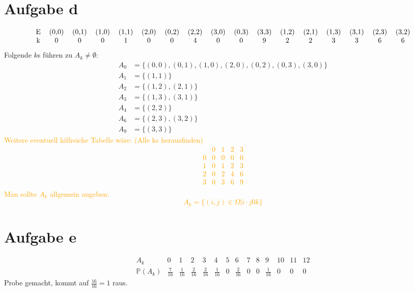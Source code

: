 \documentclass{article} %
\begin{document}
\section{Aufgabe d}
\[
\begin{tabular}{ccccccccccccccccc}
    E & (0,0)& (0,1) & (1,0)  & (1,1) & (2,0) & (0,2) & (2,2) & (3,0) & (0,3) & (3,3) & (1,2) & (2,1) & (1,3) & (3,1) & (2,3) & (3,2) \\
    k & 0 & 0 & 0 & 1 & 0& 0 & 4 & 0 & 0 & 9 & 2 & 2 & 3 & 3 & 6 & 6  
\end{tabular}
\]
Folgende $k$s führen zu $A_k \neq \emptyset$:
\begin{align*}
    A_0 & = \{(0,0), (0,1), (1,0), (2,0), (0,2), (0,3), (3,0)\} \\
    A_1 & = \{(1,1)\} \\
    A_2 & = \{(1,2), (2,1)\} \\
    A_3 & = \{(1,3), (3,1)\} \\
    A_4 & = \{(2,2)\} \\
    A_6 & = \{(2,3), (3,2)\} \\
    A_9 & = \{(3,3)\}
\end{align*}
\textcolor{Orange}{
Weitere eventuell hilfreiche Tabelle wäre: (Alle ks herausfinden)
\[
\begin{array}{c|cccc}
     & 0 & 1 & 2 & 3 \\ \hline
     0 & 0 & 0 & 0 & 0 \\
     1 & 0 & 1 & 2 & 3\\
     2 & 0 & 2 & 4 & 6 \\
     3 & 0 & 3 & 6 & 9\\
\end{array}
\]
Man sollte $A_k$ allgemein angeben: 
\[
A_k = \{(i,j) \in \Omega | i \cdot j 0 k\}
\]
}
\section{Aufgabe e}
\[
\begin{array}{c|ccccccccccccc}
    A_k & 0 & 1 & 2 & 3 & 4 & 5 & 6 & 7 & 8 & 9 & 10 & 11 & 12  \\
    \mathbb{P}(A_k) & \frac{7}{16} & \frac{1}{16} & \frac{2}{16} & \frac{2}{16} & \frac{1}{16} & 0 & \frac{2}{16} & 0 & 0 & \frac{1}{16} & 0 & 0 & 0 
\end{array}
\]
Probe gemacht, kommt auf $\frac{16}{16} = 1$ raus. 
\end{document}

